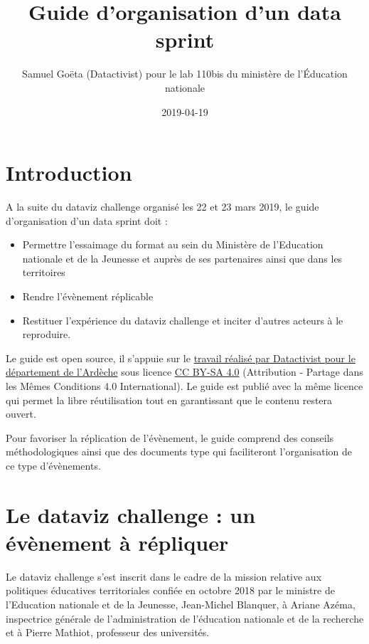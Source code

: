 \documentclass[]{book}
\title{Guide d'organisation d'un data sprint}
\author{Samuel Goëta (Datactivist) pour le lab 110bis du ministère de
l'Éducation nationale}
\date{2019-04-19}
\begin{document}
\maketitle

{
\setcounter{tocdepth}{1}
\tableofcontents
}
\chapter*{Introduction}\label{introduction}

A la suite du dataviz challenge organisé les 22 et 23 mars 2019, le
guide d'organisation d'un data sprint doit :

\begin{itemize}
\item
  Permettre l'essaimage du format au sein du Ministère de l'Education
  nationale et de la Jeunesse et auprès de ses partenaires ainsi que
  dans les territoires
\item
  Rendre l'évènement réplicable
\item
  Restituer l'expérience du dataviz challenge et inciter d'autres
  acteurs à le reproduire.
\end{itemize}

Le guide est open source, il s'appuie sur le
\href{https://docs.google.com/document/d/1uDw4Maifjl_egJ95y-F0dkXEyu2MNfhc2GvNEmjhPq8/edit\#heading=h.9ofnjz67swln}{travail
réalisé par Datactivist pour le département de l'Ardèche} sous licence
\href{https://creativecommons.org/licenses/by-sa/4.0/deed.fr}{CC BY-SA
4.0} (Attribution - Partage dans les Mêmes Conditions 4.0
International). Le guide est publié avec la même licence qui permet la
libre réutilisation tout en garantissant que le contenu restera ouvert.

Pour favoriser la réplication de l'évènement, le guide comprend des
conseils méthodologiques ainsi que des documents type qui faciliteront
l'organisation de ce type d'évènements.

\chapter{Le dataviz challenge : un évènement à répliquer}\label{dataviz}

Le dataviz challenge s'est inscrit dans le cadre de la mission relative
aux politiques éducatives territoriales confiée en octobre 2018 par le
ministre de l'Education nationale et de la Jeunesse, Jean-Michel
Blanquer, à Ariane Azéma, inspectrice générale de l'administration de
l'éducation nationale et de la recherche et à Pierre Mathiot, professeur
des universités.
\end{document}
